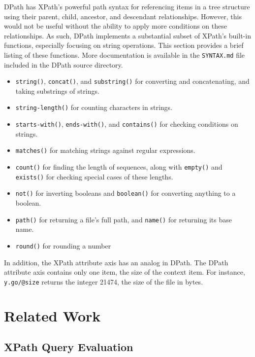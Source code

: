 \documentclass{article}
\begin{document}
DPath has XPath's powerful path syntax for referencing items in a tree structure
using their parent, child, ancestor, and descendant relationships. However, this
would not be useful without the ability to apply more conditions on these
relationships. As such, DPath implements a substantial subset of XPath's
built-in functions, especially focusing on string operations. This section
provides a brief listing of these functions. More documentation is available in
the \texttt{SYNTAX.md} file included in the DPath source directory.

\begin{itemize}
\item \texttt{string()}, \texttt{concat()}, and \texttt{substring()} for
  converting and concatenating, and taking substrings of strings.
\item \texttt{string-length()} for counting characters in strings.
\item \texttt{starts-with()}, \texttt{ends-with()}, and \texttt{contains()} for
  checking conditions on strings.
\item \texttt{matches()} for matching strings against regular expressions.
\item \texttt{count()} for finding the length of sequences, along with
  \texttt{empty()} and \texttt{exists()} for checking special cases of these
  lengths.
\item \texttt{not()} for inverting booleans and \texttt{boolean()} for
  converting anything to a boolean.
\item \texttt{path()} for returning a file's full path, and \texttt{name()} for
  returning its base name.
\item \texttt{round()} for rounding a number
\end{itemize}

In addition, the XPath attribute axis has an analog in DPath. The DPath
attribute axis contains only one item, the size of the context item. For
instance, \texttt{y.go/@size} returns the integer 21474, the size of the file in
bytes.

\section{Related Work}
\label{sec:related}

\subsection{XPath Query Evaluation}
\end{document}
